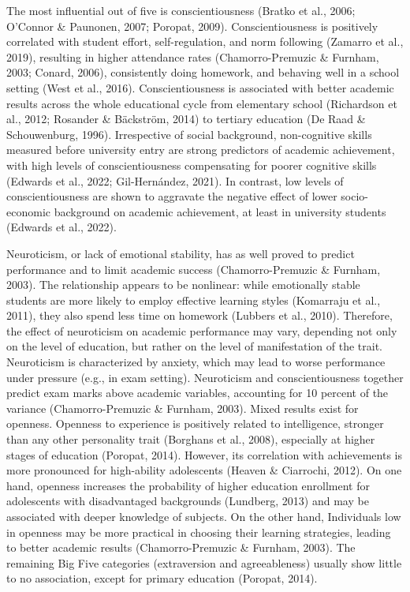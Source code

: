 \documentclass[
  12pt,
  a4paper,
]{article}
\begin{document}
The most influential out of five is conscientiousness (Bratko et al.,
2006; O'Connor \& Paunonen, 2007; Poropat, 2009). Conscientiousness is
positively correlated with student effort, self-regulation, and norm
following (Zamarro et al., 2019), resulting in higher attendance rates
(Chamorro-Premuzic \& Furnham, 2003; Conard, 2006), consistently doing
homework, and behaving well in a school setting (West et al., 2016).
Conscientiousness is associated with better academic results across the
whole educational cycle from elementary school (Richardson et al., 2012;
Rosander \& Bäckström, 2014) to tertiary education (De Raad \&
Schouwenburg, 1996). Irrespective of social background, non-cognitive
skills measured before university entry are strong predictors of
academic achievement, with high levels of conscientiousness compensating
for poorer cognitive skills (Edwards et al., 2022; Gil-Hernández, 2021).
In contrast, low levels of conscientiousness are shown to aggravate the
negative effect of lower socio-economic background on academic
achievement, at least in university students (Edwards et al., 2022).

Neuroticism, or lack of emotional stability, has as well proved to
predict performance and to limit academic success (Chamorro-Premuzic \&
Furnham, 2003). The relationship appears to be nonlinear: while
emotionally stable students are more likely to employ effective learning
styles (Komarraju et al., 2011), they also spend less time on homework
(Lubbers et al., 2010). Therefore, the effect of neuroticism on academic
performance may vary, depending not only on the level of education, but
rather on the level of manifestation of the trait. Neuroticism is
characterized by anxiety, which may lead to worse performance under
pressure (e.g., in exam setting). Neuroticism and conscientiousness
together predict exam marks above academic variables, accounting for 10
percent of the variance (Chamorro-Premuzic \& Furnham, 2003). Mixed
results exist for openness. Openness to experience is positively related
to intelligence, stronger than any other personality trait (Borghans et
al., 2008), especially at higher stages of education (Poropat, 2014).
However, its correlation with achievements is more pronounced for
high-ability adolescents (Heaven \& Ciarrochi, 2012). On one hand,
openness increases the probability of higher education enrollment for
adolescents with disadvantaged backgrounds (Lundberg, 2013) and may be
associated with deeper knowledge of subjects. On the other hand,
Individuals low in openness may be more practical in choosing their
learning strategies, leading to better academic results
(Chamorro-Premuzic \& Furnham, 2003). The remaining Big Five categories
(extraversion and agreeableness) usually show little to no association,
except for primary education (Poropat, 2014).
\end{document}
